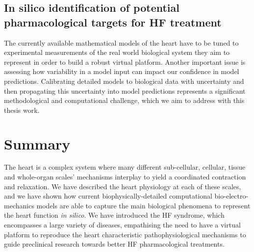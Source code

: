 %
%
%
\subsection{In silico identification of potential pharmacological targets for HF treatment}
The currently available mathematical models of the heart have to be tuned to experimental measurements of the real world biological system they aim to represent in order to build a robust virtual platform. Another important issue is assessing how variability in a model input can impact our confidence in model predictions. Calibrating detailed models to biological data with uncertainty and then propagating this uncertainty into model predictions represents a significant methodological and computational challenge, which we aim to address with this thesis work.


%
%
%
\section{Summary}\label{sec:ch1summary}
The heart is a complex system where many different sub-cellular, cellular, tissue and whole-organ scales' mechanisms interplay to yield a coordinated contraction and relaxation. We have described the heart physiology at each of these scales, and we have shown how current biophysically-detailed computational bio-electro-mechanics models are able to capture the main biological phenomena to represent the heart function \textit{in silico}. We have introduced the HF syndrome, which encompasses a large variety of diseases, empathising the need to have a virtual platform to reproduce the heart characteristic pathophysiological mechanisms to guide preclinical research towards better HF pharmacological treatments.